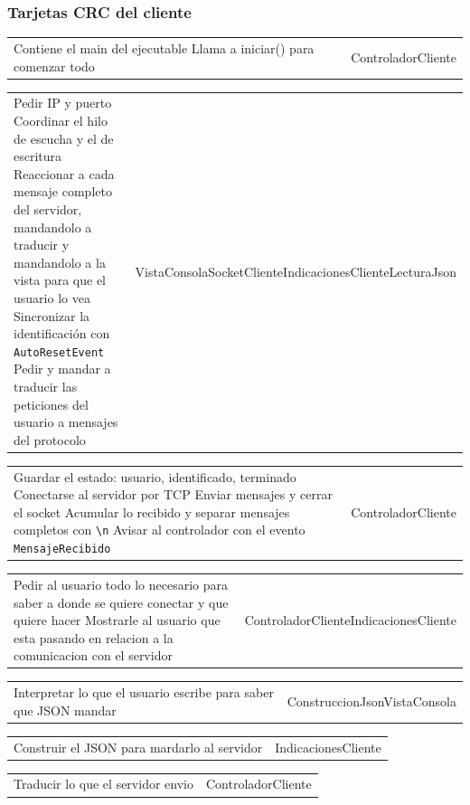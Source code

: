 \documentclass{article}
\newcommand{\tarjeta}[3]{%
      \begin{center}
      \begin{tabular}{|>{\raggedright\arraybackslash}p{7.8cm}|>{\raggedright\arraybackslash}p{4.2cm}|}
        \hline
        \multicolumn{2}{|c|}{#1} \\ \hline
        #2 & #3 \\ \hline
      \end{tabular}
      \end{center}
    }
\begin{document}
\subsubsection{Tarjetas CRC del cliente}

\tarjeta{Cliente}
{Contiene el main del ejecutable\newline
 Llama a iniciar() para comenzar todo}
{ControladorCliente}

\tarjeta{ControladorCliente (Controlador)}
{Pedir IP y puerto\newline
 Coordinar el hilo de escucha y el de escritura\newline
 Reaccionar a cada mensaje completo del servidor, mandandolo a traducir y mandandolo a la vista para que el usuario lo vea\newline
 Sincronizar la identificación con \texttt{AutoResetEvent}\newline
 Pedir y mandar a traducir las peticiones del usuario a mensajes del protocolo}
{VistaConsola\newline SocketCliente\newline IndicacionesCliente\newline LecturaJson}

\tarjeta{SocketCliente (Modelo)}
{Guardar el estado: usuario, identificado, terminado\newline
 Conectarse al servidor por TCP\newline
 Enviar mensajes y cerrar el socket\newline
 Acumular lo recibido y separar mensajes completos con \texttt{\textbackslash n}\newline
 Avisar al controlador con el evento \texttt{MensajeRecibido}}
{ControladorCliente}

\tarjeta{VistaConsola (Vista)}
{Pedir al usuario todo lo necesario para saber a donde se quiere conectar y que quiere hacer\newline
Mostrarle al usuario que esta pasando en relacion a la comunicacion con el servidor
}
{ControladorCliente\newline IndicacionesCliente}

\tarjeta{IndicacionesCliente (Controlador)}
{Interpretar lo que el usuario escribe para saber que JSON mandar}
{ConstruccionJson\newline VistaConsola}

\tarjeta{ConstruccionJson (Modelo)}
{Construir el JSON para mardarlo al servidor}
{IndicacionesCliente}

\tarjeta{LecturaJson (Modelo)}
{Traducir lo que el servidor envio}
{ControladorCliente}
\end{document}
